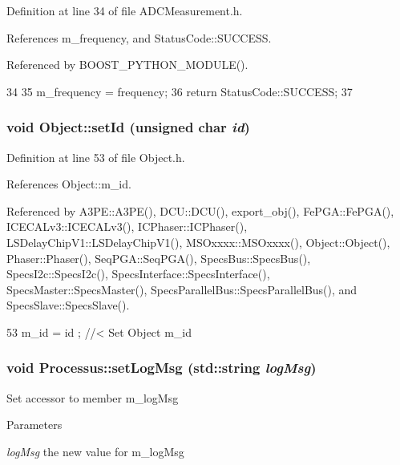 Definition at line 34 of file ADCMeasurement.h.

References m\_\-frequency, and StatusCode::SUCCESS.

Referenced by BOOST\_\-PYTHON\_\-MODULE().


\begin{DoxyCode}
34                                                  {
35     m_frequency = frequency;
36     return StatusCode::SUCCESS;
37   }
\end{DoxyCode}
\hypertarget{classObject_a398fe08cba594a0ce6891d59fe4f159f}{
\subsubsection[{setId}]{\setlength{\rightskip}{0pt plus 5cm}void Object::setId (unsigned char {\em id})}}
\label{classObject_a398fe08cba594a0ce6891d59fe4f159f}


Definition at line 53 of file Object.h.

References Object::m\_\-id.

Referenced by A3PE::A3PE(), DCU::DCU(), export\_\-obj(), FePGA::FePGA(), ICECALv3::ICECALv3(), ICPhaser::ICPhaser(), LSDelayChipV1::LSDelayChipV1(), MSOxxxx::MSOxxxx(), Object::Object(), Phaser::Phaser(), SeqPGA::SeqPGA(), SpecsBus::SpecsBus(), SpecsI2c::SpecsI2c(), SpecsInterface::SpecsInterface(), SpecsMaster::SpecsMaster(), SpecsParallelBus::SpecsParallelBus(), and SpecsSlave::SpecsSlave().


\begin{DoxyCode}
53 { m_id    = id    ; } //< Set Object m_id
\end{DoxyCode}
\hypertarget{classProcessus_a471833f89047aa9a7ff6200a31c17a1d}{
\subsubsection[{setLogMsg}]{\setlength{\rightskip}{0pt plus 5cm}void Processus::setLogMsg (std::string {\em logMsg})}}
\label{classProcessus_a471833f89047aa9a7ff6200a31c17a1d}
Set accessor to member m\_\-logMsg 
\begin{DoxyParams}{Parameters}
\item[{\em logMsg}]the new value for m\_\-logMsg \end{DoxyParams}


